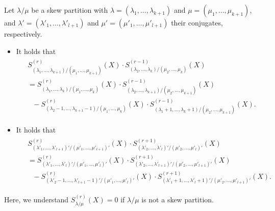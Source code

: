 \documentclass[10pt,a4paper]{amsart}
\begin{document}
\begin{theorem}
\label{fk9th}
Let $\lambda/\mu$ be a skew partition with 
$\lambda=(\lambda_1,\ldots,\lambda_{k+1})$ and 
$\mu=(\mu_1,\ldots,\mu_{k+1})$,
and $\lambda'=(\lambda'_1,\ldots,\lambda'_{l+1})$ and 
$\mu'=(\mu'_1,\ldots,\mu'_{l+1})$ their conjugates, respectively.
\begin{itemize}
\item[(1)] 
 It holds that 
\begin{align}
\label{for:DJAMT H}
\begin{split}
& 
S_{(\lambda_1,\ldots,\lambda_{k+1})/(\mu_1,\ldots,\mu_{k+1})}^{(r)}(X)
\cdot S_{(\lambda_2,\ldots,\lambda_{k})/(\mu_2,\ldots,\mu_{k})}^{(r-1)}(X)
\\
&=S_{(\lambda_1,\ldots,\lambda_{k})/(\mu_1,\ldots,\mu_{k})}^{(r)}(X)
\cdot S_{(\lambda_2,\ldots,\lambda_{k+1})/(\mu_2,\ldots,\mu_{k+1})}^{(r-1)}(X)
\\
&\ \ \ 
-S_{(\lambda_2-1,\ldots,\lambda_{k+1}-1)/(\mu_1,\ldots,\mu_{k})}^{(r)}(X)
\cdot S_{(\lambda_1+1,\ldots,\lambda_{k}+1)/(\mu_2,\ldots,\mu_{k+1})}^{(r-1)}(X).
\end{split}
\end{align}
\item[(2)]  
 It holds that 
\begin{align}
\label{for:DJAMT E}
\begin{split}
& 
S_{(\lambda'_1,\ldots,\lambda'_{l+1})'/(\mu'_1,\ldots,\mu'_{l+1})'}^{(r)}(X)
 \cdot S_{(\lambda'_2,\ldots,\lambda'_{l})'/(\mu'_2,\ldots,\mu'_{l})'}^{(r+1)}(X)
\\
&=S_{(\lambda'_1,\ldots,\lambda'_{l})'/(\mu'_1,\ldots,\mu'_{l})'}^{(r)}(X)
 \cdot S_{(\lambda'_2,\ldots,\lambda'_{l+1})'/(\mu'_2,\ldots,\mu'_{l+1})'}^{(r+1)}(X)\\
&\ \ \ 
-S_{(\lambda'_2-1,\ldots,\lambda'_{l+1}-1)'/(\mu'_1,\ldots,\mu'_{l})'}^{(r)}(X)
 \cdot  S_{(\lambda'_1+1,\ldots,\lambda'_{l}+1)'/(\mu'_2,\ldots,\mu'_{l+1})'}^{(r+1)}(X).
 \end{split}
\end{align}
\end{itemize}
Here, we understand $S^{(r)}_{\lambda/\mu}(X)=0$
if $\lambda/\mu$ is not a skew partition.
\end{theorem}
\end{document}
